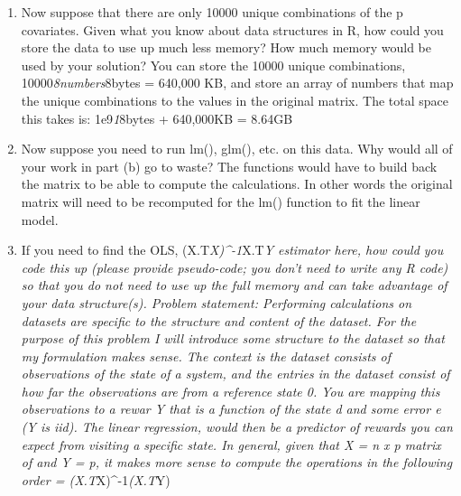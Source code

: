 \documentclass[]{article}
\begin{document}
\begin{enumerate}
\def\labelenumi{(\alph{enumi})}
\setcounter{enumi}{1}
\item
  Now suppose that there are only 10000 unique combinations of the p
  covariates. Given what you know about data structures in R, how could
  you store the data to use up much less memory? How much memory would
  be used by your solution? You can store the 10000 unique combinations,
  10000\emph{8numbers}8bytes = 640,000 KB, and store an array of numbers
  that map the unique combinations to the values in the original matrix.
  The total space this takes is: 1e9\emph{1}8bytes + 640,000KB = 8.64GB
\item
  Now suppose you need to run lm(), glm(), etc. on this data. Why would
  all of your work in part (b) go to waste? The functions would have to
  build back the matrix to be able to compute the calculations. In other
  words the original matrix will need to be recomputed for the lm()
  function to fit the linear model.
\item
  If you need to find the OLS, (X.T\emph{X)\^{}-1}X.T\emph{Y estimator
  here, how could you code this up (please provide pseudo-code; you
  don't need to write any R code) so that you do not need to use up the
  full memory and can take advantage of your data structure(s). Problem
  statement: Performing calculations on datasets are specific to the
  structure and content of the dataset. For the purpose of this problem
  I will introduce some structure to the dataset so that my formulation
  makes sense. The context is the dataset consists of observations of
  the state of a system, and the entries in the dataset consist of how
  far the observations are from a reference state 0. You are mapping
  this observations to a rewar Y that is a function of the state d and
  some error e (Y is iid). The linear regression, would then be a
  predictor of rewards you can expect from visiting a specific state. In
  general, given that X = n x p matrix of and Y = p, it makes more sense
  to compute the operations in the following order =
  (X.T}X)\^{}-1\emph{(X.T}Y)
\end{enumerate}
\end{document}
